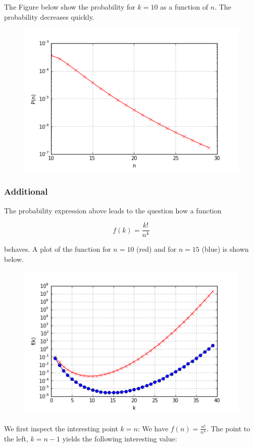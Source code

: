 The Figure below show the probability for $k=10$ as a function of $n$. The probability decreases quickly.

\begin{figure}
\includegraphics[scale=0.7]{images/elevator_2.png}
\end{figure}

\subsubsection{Additional}

The probability expression above leads to the question how a function

\[
f(k) = \frac{k!}{n^k}
\]

behaves. A plot of the function for $n=10$ (red) and for $n=15$ (blue) is shown below.

\begin{figure}
\includegraphics[scale=0.7]{images/factorial_vs_exp.png}
\end{figure}

We first inspect the interesting point $k=n$: We have $f(n) = \frac{n!}{n^n}$. The point to the left, $k=n-1$ yields the following interesting value:

